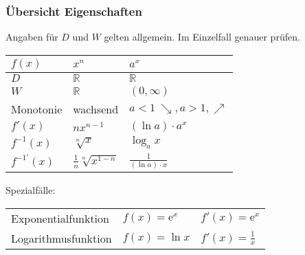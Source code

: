 \subsubsection{Übersicht Eigenschaften}
Angaben für $D$ und $W$ gelten allgemein. Im Einzelfall genauer prüfen.
\settowidth{\MyLenA}{Monotonie~~}
\begin{tabular}{@{}p{\the\MyLenA}%
				@{}p{}%
				@{}p{}}
	\textbf{$f(x)$} 		& \textbf{$x^n$}  					& \textbf{$a^x$} \\\hline
	$D$ 	 				& $\mathbb{R}$						& $\mathbb{R}$	\\
	$W$						& $\mathbb{R}$						& $(0, \infty)$ \\
	Monotonie				& wachsend							& $a < 1~\searrow, a > 1, \nearrow$\\
	$f'(x)$					& $nx^{n-1}$						& $(\ln a) \cdot a^x$\\
	$f^{-1}(x)$				& $\sqrt[n]{x}$						& $\log_a x$ \\
	$f^{-1'}(x)$			& $\frac{1}{n}\sqrt[n]{x^{1-n}}$ 	& $\frac{1}{(\ln a) \cdot x}$\\ 
\end{tabular}
Spezialfälle:
\settowidth{\MyLenA}{Logarithmusfunktion~~}
\begin{tabular}{@{}p{\the\MyLenA}%
				@{}p{}%
				@{}p{}}
Exponentialfunktion	& $f(x) = \mathrm e^x$	 	& $f'(x) = \mathrm e^x$\\
Logarithmusfunktion	& $f(x) = \ln x$			& $f'(x) = \frac{1}{x}$\\
\end{tabular}



